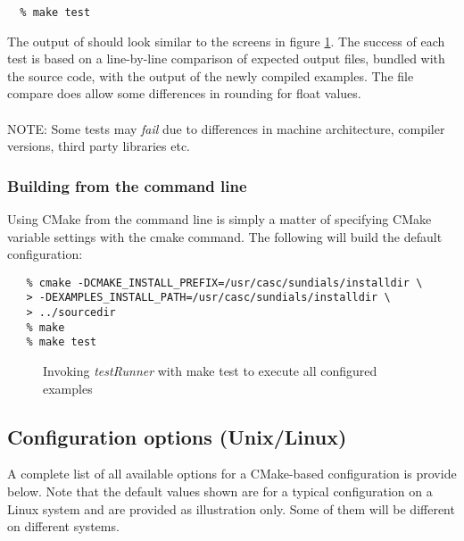 \begin{verbatim}
  % make test
\end{verbatim}
The output of  should look similar to the screens in figure
\ref{f:testrunner}. The success of each test is based on a line-by-line comparison of expected output files, bundled with the source code, with
the output of the newly compiled examples. The file compare does allow some differences in rounding for float values.\\\\
NOTE: Some tests may {\em fail} due to differences in machine architecture, compiler versions, third party libraries etc.{\warn}
 

\subsubsection*{Building from the command line}

Using CMake from the command line is simply a matter of specifying CMake variable settings
with the {\id cmake} command.  The following will build the default configuration:  

\begin{verbatim}
   % cmake -DCMAKE_INSTALL_PREFIX=/usr/casc/sundials/installdir \
   > -DEXAMPLES_INSTALL_PATH=/usr/casc/sundials/installdir \
   > ../sourcedir
   % make
   % make test
\end{verbatim}

\begin{figure}[!ht]
{\centerline{}}
\vspace{3 mm}
{\centerline{}}
\caption [Running {\em testRunner}]
{Invoking {\em testRunner} with {\id make test} to execute all configured
{\id examples} }
\label{f:testrunner}
\end{figure}



\subsection{Configuration options (Unix/Linux)}\label{ss:configuration_options_nix}

A complete list of all available options for a CMake-based {\sundials}
configuration is provide below. Note that the default values shown are for 
a typical configuration on a Linux system and are provided as illustration only.
Some of them will be different on different systems.

